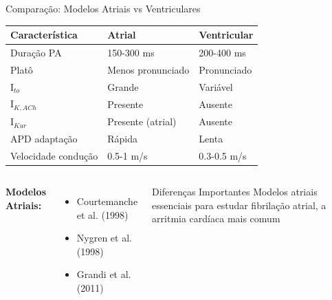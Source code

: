 \begin{frame}{Comparação: Modelos Atriais vs Ventriculares}
\begin{center}
\begin{tabular}{lll}
\toprule
\textbf{Característica} & \textbf{Atrial} & \textbf{Ventricular} \\
\midrule
Duração PA & 150-300 ms & 200-400 ms \\
Platô & Menos pronunciado & Pronunciado \\
I$_{to}$ & Grande & Variável \\
I$_{K,ACh}$ & Presente & Ausente \\
I$_{Kur}$ & Presente (atrial) & Ausente \\
APD adaptação & Rápida & Lenta \\
Velocidade condução & 0.5-1 m/s & 0.3-0.5 m/s \\
\bottomrule
\end{tabular}
\end{center}

\vspace{0.3cm}

\begin{columns}
\textbf{Modelos Atriais:}
\begin{itemize}
    \item Courtemanche et al. (1998)
    \item Nygren et al. (1998)
    \item Grandi et al. (2011)
\end{itemize}

\begin{alertblock}{Diferenças Importantes}
Modelos atriais essenciais para estudar fibrilação atrial, a arritmia cardíaca mais comum
\end{alertblock}
\end{columns}
\end{frame}

